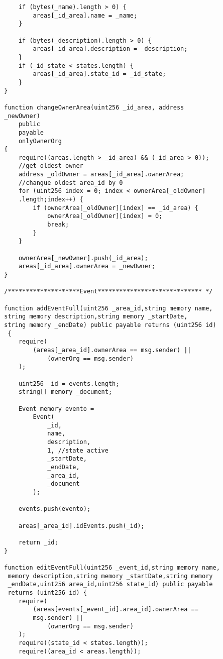 \begin{verbatim}
            if (bytes(_name).length > 0) {
                areas[_id_area].name = _name;
            }
    
            if (bytes(_description).length > 0) {
                areas[_id_area].description = _description;
            }
            if (_id_state < states.length) {
                areas[_id_area].state_id = _id_state;
            }
        }
    
        function changeOwnerArea(uint256 _id_area, address 
        _newOwner)
            public
            payable
            onlyOwnerOrg
        {
            require((areas.length > _id_area) && (_id_area > 0));
            //get oldest owner
            address _oldOwner = areas[_id_area].ownerArea;
            //changue oldest area_id by 0
            for (uint256 index = 0; index < ownerArea[_oldOwner]
            .length;index++) {
                if (ownerArea[_oldOwner][index] == _id_area) {
                    ownerArea[_oldOwner][index] = 0;
                    break;
                }
            }
    
            ownerArea[_newOwner].push(_id_area);
            areas[_id_area].ownerArea = _newOwner;
        }
    
        /********************Event***************************** */
    
        function addEventFull(uint256 _area_id,string memory name,
        string memory description,string memory _startDate,
        string memory _endDate) public payable returns (uint256 id)
         {
            require(
                (areas[_area_id].ownerArea == msg.sender) ||
                    (ownerOrg == msg.sender)
            );
    
            uint256 _id = events.length;
            string[] memory _document;
    
            Event memory evento =
                Event(
                    _id,
                    name,
                    description,
                    1, //state active
                    _startDate,
                    _endDate,
                    _area_id,
                    _document
                );
    
            events.push(evento);
    
            areas[_area_id].idEvents.push(_id);
    
            return _id;
        }
    
        function editEventFull(uint256 _event_id,string memory name,
         memory description,string memory _startDate,string memory 
         _endDate,uint256 area_id,uint256 state_id) public payable 
         returns (uint256 id) {
            require(
                (areas[events[_event_id].area_id].ownerArea == 
                msg.sender) ||
                    (ownerOrg == msg.sender)
            );
            require((state_id < states.length));
            require((area_id < areas.length));
    

\end{verbatim}
